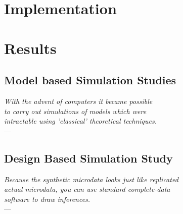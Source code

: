 \documentclass[
		twoside,openright,titlepage,numbers=noenddot,headinclude,1headlines,
                footinclude=true,cleardoublepage=empty,
                BCOR=5mm,paper=a4,fontsize=11pt, %
                american, %
                ]{scrreprt}
\begin{document}







\part{Implementation}\label{part:implementation}





\part{Results}\label{part:results}

\chapter{Model based Simulation Studies}
\begin{flushright}{\slshape
With the advent of computers it became possible \\
to carry out simulations of models which were \\
intractable using 'classical' theoretical techniques.}\\ \medskip
--- \textcite[xv]{Lan14}
\end{flushright}


\label{chap:results_model_based}





\chapter{Design Based Simulation Study}\label{chap:results_design_based}

\begin{flushright}{\slshape
Because the synthetic microdata looks just like replicated \\
actual microdata, you can use standard complete\hyp{}data \\
software to draw inferences.
}\\ \medskip
--- \textcite{Rub93}
\end{flushright}
\end{document}
